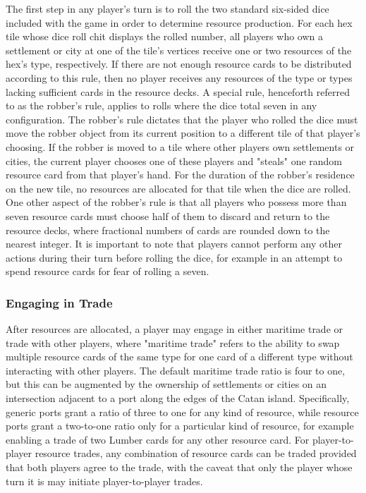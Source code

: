 \documentclass[pageno]{jpaper}
\begin{document}
\begin{doublespacing}
The first step in any player's turn is to roll the two standard six-sided dice included with the game in order to determine resource production. For each hex tile whose dice roll chit displays the rolled number, all players who own a settlement or city at one of the tile's vertices receive one or two resources of the hex's type, respectively. If there are not enough resource cards to be distributed according to this rule, then no player receives any resources of the type or types lacking sufficient cards in the resource decks. A special rule, henceforth referred to as the robber's rule, applies to rolls where the dice total seven in any configuration. The robber's rule dictates that the player who rolled the dice must move the robber object from its current position to a different tile of that player's choosing. If the robber is moved to a tile where other players own settlements or cities, the current player chooses one of these players and "steals" one random resource card from that player's hand. For the duration of the robber's residence on the new tile, no resources are allocated for that tile when the dice are rolled. One other aspect of the robber's rule is that all players who possess more than seven resource cards must choose half of them to discard and return to the resource decks, where fractional numbers of cards are rounded down to the nearest integer. It is important to note that players cannot perform any other actions during their turn before rolling the dice, for example in an attempt to spend resource cards for fear of rolling a seven.

\hypertarget{sec:engaging_in_trade}{}
\subsubsection{Engaging in Trade}

After resources are allocated, a player may engage in either maritime trade or trade with other players, where "maritime trade" refers to the ability to swap multiple resource cards of the same type for one card of a different type without interacting with other players. The default maritime trade ratio is four to one, but this can be augmented by the ownership of settlements or cities on an intersection adjacent to a port along the edges of the Catan island. Specifically, generic ports grant a ratio of three to one for any kind of resource, while resource ports grant a two-to-one ratio only for a particular kind of resource, for example enabling a trade of two Lumber cards for any other resource card. For player-to-player resource trades, any combination of resource cards can be traded provided that both players agree to the trade, with the caveat that only the player whose turn it is may initiate player-to-player trades.


\end{doublespacing}
\end{document}
